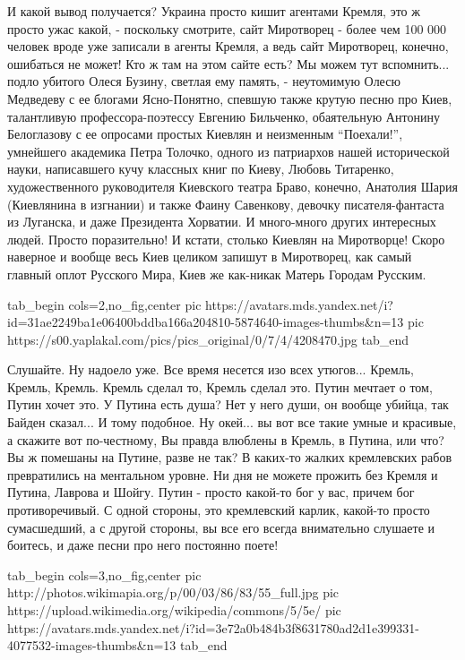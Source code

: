 И какой вывод получается? Украина просто кишит агентами Кремля, это ж просто
ужас какой, - поскольку смотрите, сайт Миротворец - более чем 100 000  человек
вроде уже записали в агенты Кремля, а ведь сайт Миротворец, конечно, ошибаться
не может!  Кто ж там на этом сайте есть? Мы можем тут вспомнить... подло
убитого Олеся Бузину, светлая ему память, - неутомимую Олесю Медведеву с ее
блогами Ясно-Понятно, спевшую также крутую песню про Киев, талантливую
профессора-поэтессу Евгению Бильченко, обаятельную Антонину Белоглазову с ее
опросами простых Киевлян и неизменным \enquote{Поехали!}, умнейшего академика
Петра Толочко, одного из патриархов нашей исторической науки, написавшего кучу
классных книг по Киеву, Любовь Титаренко, художественного руководителя
Киевского театра Браво, конечно, Анатолия Шария (Киевлянина в изгнании) и также
Фаину Савенкову, девочку писателя-фантаста из Луганска, и даже Президента
Хорватии. И много-много других интересных людей.  Просто поразительно!  И
кстати, столько Киевлян на Миротворце! Скоро наверное и вообще весь Киев
целиком запишут в Миротворец, как самый главный оплот Русского Мира, Киев же
как-никак Матерь Городам Русским.

\ifcmt
  tab_begin cols=2,no_fig,center
     pic https://avatars.mds.yandex.net/i?id=31ae2249ba1e06400bddba166a204810-5874640-images-thumbs&n=13
		 pic https://s00.yaplakal.com/pics/pics_original/0/7/4/4208470.jpg
  tab_end
\fi

Слушайте. Ну надоело уже. Все время несется изо всех утюгов... Кремль, Кремль,
Кремль. Кремль сделал то, Кремль сделал это. Путин мечтает о том, Путин хочет
это. У Путина есть душа? Нет у него души, он вообще убийца, так Байден
сказал... И тому подобное. Ну окей...  вы вот все такие умные и красивые, а
скажите вот по-честному, Вы правда влюблены в Кремль, в Путина, или что? Вы ж
помешаны на Путине, разве не так? В каких-то жалких кремлевских рабов
превратились на ментальном уровне. Ни дня не можете прожить без Кремля и
Путина, Лаврова и Шойгу. Путин - просто какой-то бог у вас, причем бог
противоречивый. С одной стороны, это кремлевский карлик, какой-то просто
сумасшедший, а с другой стороны, вы все его всегда внимательно слушаете и
боитесь, и даже песни про него постоянно поете!

\ifcmt
  tab_begin cols=3,no_fig,center
     pic http://photos.wikimapia.org/p/00/03/86/83/55_full.jpg
		 pic https://upload.wikimedia.org/wikipedia/commons/5/5e/%
		 pic https://avatars.mds.yandex.net/i?id=3e72a0b484b3f8631780ad2d1e399331-4077532-images-thumbs&n=13 
  tab_end
\fi

